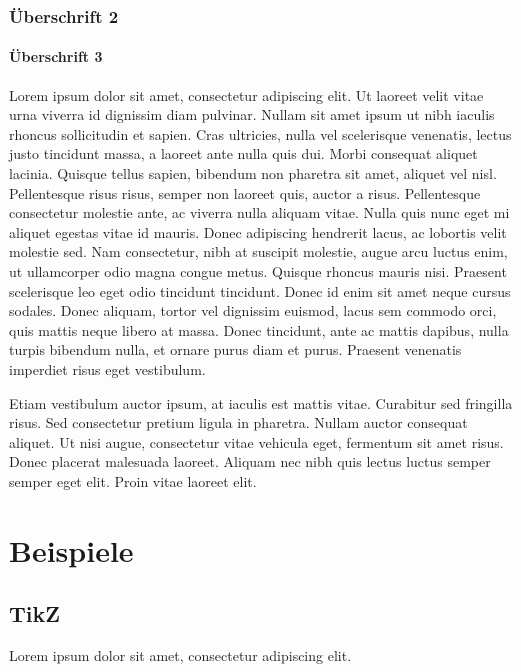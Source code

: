 \documentclass[a4paper,10pt
headsepline,           %
doubleside,            %
pointlessnumbers,      %
bibtotoc,              %
BCOR15mm,               %
leqno					%
]{scrbook}
\begin{document}
\subsection{Überschrift 2}

\subsubsection{Überschrift 3}

Lorem ipsum dolor sit amet, consectetur adipiscing elit.
Ut laoreet velit vitae urna viverra id dignissim diam pulvinar.
Nullam sit amet ipsum ut nibh iaculis rhoncus sollicitudin et sapien.
Cras ultricies, nulla vel scelerisque venenatis, lectus justo tincidunt massa, a laoreet ante nulla quis dui.
Morbi consequat aliquet lacinia.
Quisque tellus sapien, bibendum non pharetra sit amet, aliquet vel nisl.
Pellentesque risus risus, semper non laoreet quis, auctor a risus.
Pellentesque consectetur molestie ante, ac viverra nulla aliquam vitae.
Nulla quis nunc eget mi aliquet egestas vitae id mauris.
Donec adipiscing hendrerit lacus, ac lobortis velit molestie sed.
Nam consectetur, nibh at suscipit molestie, augue arcu luctus enim, ut ullamcorper odio magna congue metus.
Quisque rhoncus mauris nisi.
Praesent scelerisque leo eget odio tincidunt tincidunt.
Donec id enim sit amet neque cursus sodales.
Donec aliquam, tortor vel dignissim euismod, lacus sem commodo orci, quis mattis neque libero at massa.
Donec tincidunt, ante ac mattis dapibus, nulla turpis bibendum nulla, et ornare purus diam et purus.
Praesent venenatis imperdiet risus eget vestibulum.

Etiam vestibulum auctor ipsum, at iaculis est mattis vitae.
Curabitur sed fringilla risus.
Sed consectetur pretium ligula in pharetra.
Nullam auctor consequat aliquet.
Ut nisi augue, consectetur vitae vehicula eget, fermentum sit amet risus.
Donec placerat malesuada laoreet.
Aliquam nec nibh quis lectus luctus semper semper eget elit.
Proin vitae laoreet elit.

\chapter{Beispiele}

\section{TikZ}

Lorem ipsum dolor sit amet, consectetur adipiscing elit.
\end{document}
